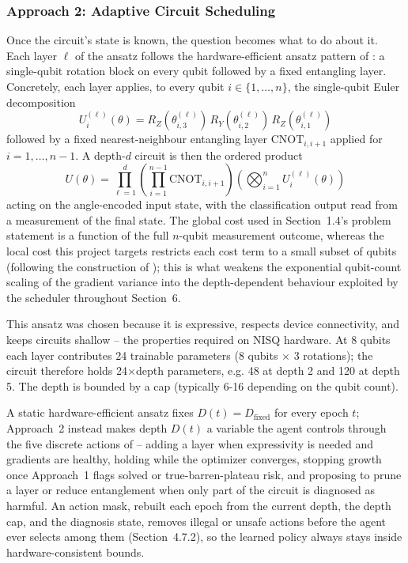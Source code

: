 \subsubsection{Approach 2: Adaptive Circuit Scheduling}
Once the circuit's state is known, the question becomes what to do about it. Each layer $\ell$ of the ansatz follows the hardware-efficient ansatz pattern of \citet{kandala2017hardware}: a single-qubit rotation block on every qubit followed by a fixed entangling layer. Concretely, each layer applies, to every qubit $i \in \{1, \dots, n\}$, the single-qubit Euler decomposition
\begin{equation}
U_i^{(\ell)}(\theta) = R_Z(\theta_{i,3}^{(\ell)})\, R_Y(\theta_{i,2}^{(\ell)})\, R_Z(\theta_{i,1}^{(\ell)})
\end{equation}
followed by a fixed nearest-neighbour entangling layer $\mathrm{CNOT}_{i,i+1}$ applied for $i = 1, \dots, n-1$. A depth-$d$ circuit is then the ordered product
\begin{equation}
U(\theta) = \prod_{\ell=1}^{d} \left( \prod_{i=1}^{n-1} \mathrm{CNOT}_{i,i+1} \right) \left( \bigotimes_{i=1}^{n} U_i^{(\ell)}(\theta) \right)
\end{equation}
acting on the angle-encoded input state, with the classification output read from a measurement of the final state. The global cost used in Section~1.4's problem statement is a function of the full $n$-qubit measurement outcome, whereas the local cost this project targets restricts each cost term to a small subset of qubits (following the construction of \citet{cerezo2021cost}); this is what weakens the exponential qubit-count scaling of the gradient variance into the depth-dependent behaviour exploited by the scheduler throughout Section~6.

This ansatz was chosen because it is expressive, respects device connectivity, and keeps circuits shallow -- the properties required on NISQ hardware. At 8 qubits each layer contributes 24 trainable parameters (8 qubits $\times$ 3 rotations); the circuit therefore holds 24$\times$depth parameters, e.g. 48 at depth 2 and 120 at depth 5. The depth is bounded by a cap (typically 6-16 depending on the qubit count).

A static hardware-efficient ansatz fixes $D(t) = D_{\text{fixed}}$ for every epoch $t$; Approach~2 instead makes depth $D(t)$ a variable the agent controls through the five discrete actions of  -- adding a layer when expressivity is needed and gradients are healthy, holding while the optimizer converges, stopping growth once Approach~1 flags solved or true-barren-plateau risk, and proposing to prune a layer or reduce entanglement when only part of the circuit is diagnosed as harmful. An action mask, rebuilt each epoch from the current depth, the depth cap, and the diagnosis state, removes illegal or unsafe actions before the agent ever selects among them (Section~4.7.2), so the learned policy always stays inside hardware-consistent bounds.

